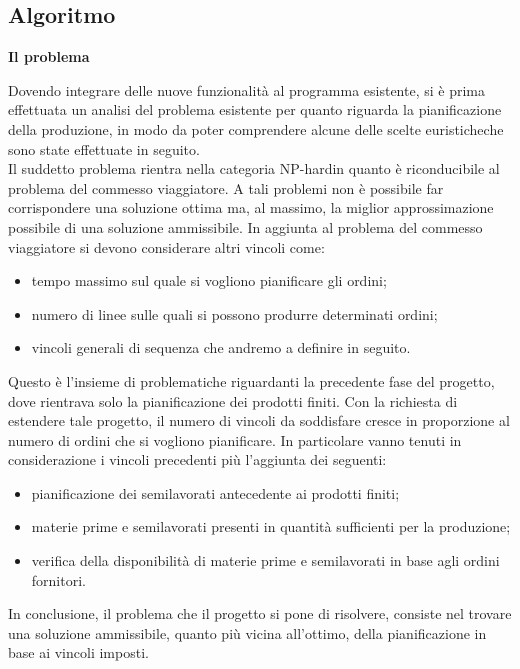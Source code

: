 \subsection{Algoritmo}

\textbf{Il problema}

Dovendo integrare delle nuove funzionalità al programma esistente, si è prima effettuata un analisi del problema esistente per quanto riguarda la pianificazione della produzione,
in modo da poter comprendere alcune delle scelte euristiche\glosp che sono state effettuate in seguito.\\
Il suddetto problema rientra nella categoria NP-hard\glosp in quanto è riconducibile al problema del commesso viaggiatore\glo. A tali problemi non è possibile far corrispondere
una soluzione ottima ma, al massimo, la miglior approssimazione possibile di una soluzione ammissibile. In aggiunta al problema del commesso viaggiatore si devono considerare
altri vincoli come: 
\begin{itemize}
    \item tempo massimo sul quale si vogliono pianificare gli ordini;
    \item numero di linee sulle quali si possono produrre determinati ordini;
    \item vincoli generali di sequenza che andremo a definire in seguito.
\end{itemize}

Questo è l'insieme di problematiche riguardanti la precedente fase del progetto, dove rientrava solo la pianificazione dei prodotti finiti.
Con la richiesta di estendere tale progetto, il numero di vincoli da soddisfare cresce in proporzione al numero di ordini che si vogliono pianificare.
In particolare vanno tenuti in considerazione i vincoli precedenti più l'aggiunta dei seguenti:

\begin{itemize}
    \item pianificazione dei semilavorati antecedente ai prodotti finiti;
    \item materie prime e semilavorati presenti in quantità sufficienti per la produzione;
    \item verifica della disponibilità di materie prime e semilavorati in base agli ordini fornitori.
\end{itemize}

In conclusione, il problema che il progetto si pone di risolvere, consiste nel trovare una soluzione ammissibile, quanto più vicina all'ottimo,
della pianificazione
in base ai vincoli imposti.\newline

